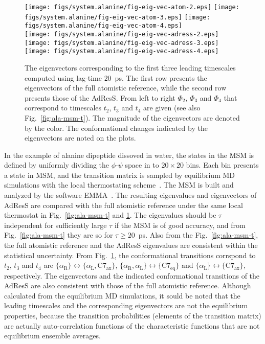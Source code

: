 \documentclass[epjST]{svjour}
\newcommand{\confa}[0]{{\alpha_{\textrm{R}}}}
\newcommand{\confb}[0]{{\textrm{C}7_{\textrm{eq}}}}
\newcommand{\confc}[0]{{\alpha_{\textrm{L}}}}
\newcommand{\confd}[0]{{\textrm{C}7_{\textrm{ax}}}}
\begin{document}
\begin{figure}
  \centering
  \texttt{[image: figs/system.alanine/fig-eig-vec-atom-2.eps]}
  \texttt{[image: figs/system.alanine/fig-eig-vec-atom-3.eps]}
  \texttt{[image: figs/system.alanine/fig-eig-vec-atom-4.eps]}\\[-.4cm]
  \texttt{[image: figs/system.alanine/fig-eig-vec-adress-2.eps]}
  \texttt{[image: figs/system.alanine/fig-eig-vec-adress-3.eps]}
  \texttt{[image: figs/system.alanine/fig-eig-vec-adress-4.eps]}\\
  \caption{The eigenvectors corresponding to the first three leading timescales computed using lag-time $20$~ps.
    The first row presents the eigenvectors of the full atomistic reference, while the second
    row presents those of the AdResS. From left to right $\Phi_2$, $\Phi_3$ and $\Phi_4$ that correspond to
    timescales $t_2$, $t_3$ and $t_4$ are given (see also Fig.~\ref{fig:ala-msm-t}). The magnitude of the eigenvectors are
    denoted by the color. 
    The conformational
    changes indicated by the eigenvectors are noted on the plots.}
  \label{fig:ala-msm-v}
\end{figure}


In the example of alanine dipeptide dissoved in water, the states in the MSM
is defined by uniformly dividing the $\phi$-$\psi$ space in to $20\times 20$ bins.
Each bin presents a state in MSM, and the transition matrix is sampled by equilibrium
MD simulations with the local thermostating scheme~\cite{wang2014exploring}.
The MSM is built and analyzed by the software EMMA~\cite{senne2012emma}.
The resulting eigenvalues and eigenvectors of AdResS are compared with the full atomistic reference under the same local thermostat in
Fig.~\ref{fig:ala-msm-t} and \ref{fig:ala-msm-v}. The
eigenvalues should be $\tau$ independent for sufficiently large $\tau$ if the MSM is of good
accuracy, and from Fig.~\ref{fig:ala-msm-t} they are so for $\tau \geq 20$~ps.
Also from the Fig.~\ref{fig:ala-msm-t}, the full atomistic
reference and the AdResS eigenvalues are consistent within the statistical
uncertainty.
From Fig.~\ref{fig:ala-msm-v}, the conformational transitions corrspond
to $t_2$, $t_3$ and $t_4$ are $\{\confa \} \leftrightarrow \{\confc,\confd\}$,
$\{\confa, \confc \} \leftrightarrow \{\confb\}$ and $\{\confc \} \leftrightarrow \{\confd\}$, respectively.
The eigenvectors and the indicated conformational transitions of the AdResS are also consistent with
those of the full atomistic reference. Although calculated from the
equilibrium MD simulations, it sould be noted that the leading timescales and the
corresponding eigenvectors are not the equilibrium properties, because
the transition probabilities (elements of the transition matrix) are actually
auto-correlation functions of the characteristic functions that are not equilibrium ensemble averages.
\end{document}
